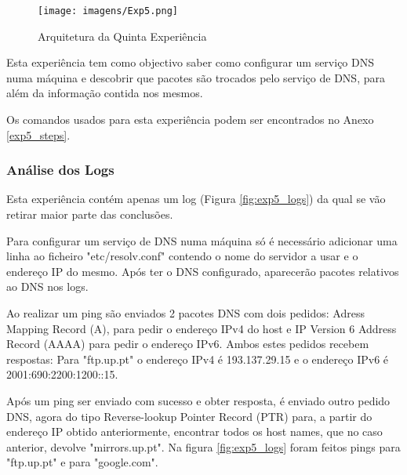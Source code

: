 \begin{figure}[h!]
\centering
\texttt{[image: imagens/Exp5.png]}
\caption{Arquitetura da Quinta Experiência}
\label{fig:exp5}
\end{figure}

Esta experiência tem como objectivo saber como configurar um serviço DNS numa máquina e descobrir que pacotes são trocados pelo serviço de DNS, para além da informação contida nos mesmos.

Os comandos usados para esta experiência podem ser encontrados no Anexo \ref{exp5_steps}.

\subsubsection{Análise dos Logs}

Esta experiência contém apenas um log (Figura \ref{fig:exp5_logs}) da qual se vão retirar maior parte das conclusões.

Para configurar um serviço de DNS numa máquina só é necessário adicionar uma linha ao ficheiro "etc/resolv.conf" contendo o nome do servidor a usar e o endereço IP do mesmo. Após ter o DNS configurado, aparecerão pacotes relativos ao DNS nos logs.

Ao realizar um ping são enviados 2 pacotes DNS com dois pedidos: Adress Mapping Record (A), para pedir o endereço IPv4 do host e IP Version 6 Address Record (AAAA) para pedir o endereço IPv6. Ambos estes pedidos recebem respostas: Para "ftp.up.pt" o endereço IPv4 é 193.137.29.15 e o endereço IPv6 é 2001:690:2200:1200::15.

Após um ping ser enviado com sucesso e obter resposta, é enviado outro pedido DNS, agora do tipo Reverse-lookup Pointer Record (PTR) para, a partir do endereço IP obtido anteriormente, encontrar todos os host names, que no caso anterior, devolve "mirrors.up.pt". Na figura \ref{fig:exp5_logs} foram feitos pings para "ftp.up.pt" e para "google.com".